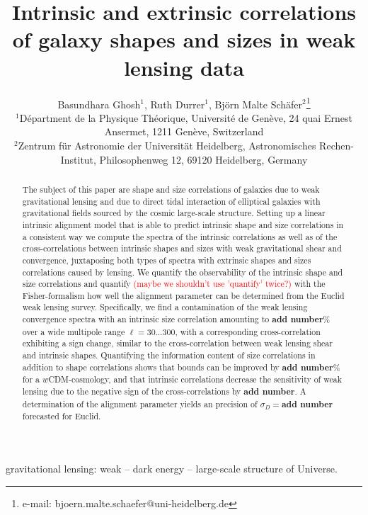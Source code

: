 \documentclass[a4paper,fleqn,usenatbib]{mnras}
\title[Intrinsic sizes and shapes of galaxies]
{Intrinsic and extrinsic correlations of galaxy shapes and sizes in weak lensing data}
\author[B. Ghosh, R. Durrer, B.M. Sch{\"a}fer]
{Basundhara Ghosh$^1$, Ruth Durrer$^1$, Bj{\"o}rn Malte Sch{\"a}fer$^2$\thanks{e-mail: bjoern.malte.schaefer@uni-heidelberg.de}\\
$^1$D{\'e}partment de la Physique Th{\'e}orique, Universit{\'e} de Gen{\`e}ve, 24 quai Ernest Ansermet, 1211 Gen{\`e}ve, Switzerland\\
$^2$Zentrum f{\"u}r Astronomie der Universit{\"a}t Heidelberg, Astronomisches Rechen-Institut, Philosophenweg 12, 69120 Heidelberg, Germany
}
\def\spirou#1{{\bf #1}}
\newcommand\BG[1]{\textcolor{red}{#1}}
\begin{document}
\pagerange{\pageref{firstpage}--\pageref{lastpage}}
\maketitle
\label{firstpage}


\begin{abstract}
The subject of this paper are shape and size correlations of galaxies due to weak gravitational lensing and due to direct tidal interaction of elliptical galaxies with gravitational fields sourced by the cosmic large-scale structure. Setting up a linear intrinsic alignment model that is able to predict intrinsic shape and size correlations in a consistent way we compute the spectra of the intrinsic correlations as well as of the cross-correlations between intrinsic shapes and sizes with weak gravitational shear and convergence, juxtaposing both types of spectra with extrinsic shapes and sizes correlations caused by lensing. We quantify the observability of the intrinsic shape and size correlations and quantify \BG{(maybe we shouldn't use 'quantify' twice?)} with the Fisher-formalism how well the alignment parameter can be determined from the Euclid weak lensing survey. Specifically, we find a contamination of the weak lensing convergence spectra with an intrinsic size correlation amounting to \spirou{add number}\% over a wide multipole range $\ell=30\ldots300$, with a corresponding cross-correlation exhibiting a sign change, similar to the cross-correlation between weak lensing shear and intrinsic shapes. Quantifying the information content of size correlations in addition to shape correlations shows that bounds can be improved by \spirou{add number}\% for a $w$CDM-cosmology, and that intrinsic correlations decrease the sensitivity of weak lensing due to the negative sign of the cross-correlations by \spirou{add number}. A determination of the alignment parameter yields an precision of $\sigma_D=$\spirou{add number} forecasted for Euclid.
\end{abstract}


\begin{keywords}
gravitational lensing: weak -- dark energy -- large-scale structure of Universe.
\end{keywords}


\end{document}
